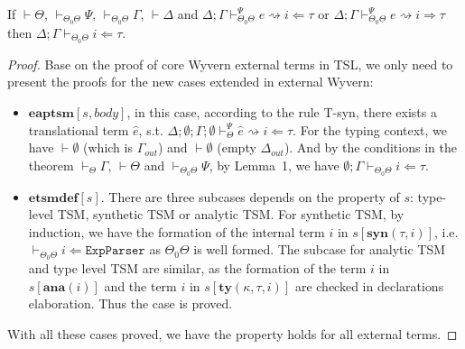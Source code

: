 \documentclass{sig-alternate}
\begin{document}
\begin{theorem}
If $\vdash\Theta$, $\vdash_{\Theta_0\Theta}\Psi$, $\vdash_{\Theta_0\Theta}\Gamma$, $\vdash\Delta$ and $\Delta;\Gamma\vdash_{\Theta_0\Theta}^{\Psi} e\rightsquigarrow i\Leftarrow\tau$ or $\Delta;\Gamma\vdash_{\Theta_0\Theta}^{\Psi} e\rightsquigarrow i\Rightarrow\tau$ then $\Delta;\Gamma\vdash_{\Theta_0\Theta} i\Leftarrow\tau$.
\end{theorem}
\begin{proof}
Base on the proof of core Wyvern external terms in TSL, we only need to present the proofs for the new cases extended in external Wyvern:
\begin{itemize}
\item $\mathbf{eaptsm}[s,body]$, in this case, according to the rule T-syn, there exists a translational term $\hat{e}$, s.t. $\Delta;\emptyset;\Gamma;\emptyset\vdash_{\Theta}^{\Psi}\hat{e}\rightsquigarrow i\Leftarrow \tau$. For the typing context, we have $\vdash\emptyset$ (which is $\Gamma_{out}$) and $\vdash\emptyset$ (empty $\Delta_{out}$). And by the conditions in the theorem $\vdash_{\Theta}\Gamma$, $\vdash\Theta$ and $\vdash_{\Theta_0\Theta}\Psi$, by Lemma~1, we have $\emptyset;\Gamma\vdash_{\Theta_0\Theta}i\Leftarrow\tau$. 
\item $\mathbf{etsmdef}[s]$. There are three subcases depends on the property of $s$: type-level TSM, synthetic TSM or analytic TSM. For synthetic TSM, by induction, we have the formation of the internal term $i$ in $s[\mathbf{syn}(\tau,i)]$, i.e. $\vdash_{\Theta_0\Theta}i\Leftarrow \mathtt{ExpParser}$ as $\Theta_0\Theta$ is well formed. The subcase for analytic TSM and type level TSM are similar, as the formation of the term $i$ in $s[\mathbf{ana}(i)]$ and the term $i$ in $s[\mathbf{ty}(\kappa,\tau,i)]$ are checked in declarations elaboration. Thus the case is proved.
\end{itemize}
With all these cases proved, we have the property holds for all external terms.
\end{proof}
\end{document}
